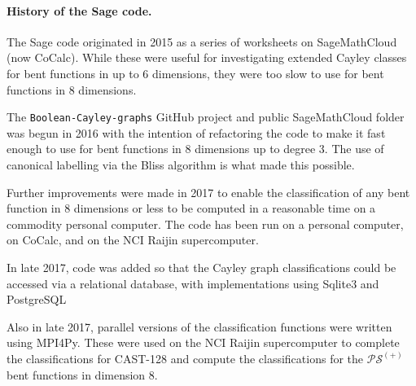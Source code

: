 \documentclass[12pt,a4paper]{article}
\begin{document}
\paragraph*{History of the Sage code.}

The Sage code originated in 2015 as a series of worksheets on Sage\-Math\-Cloud (now CoCalc).
While these were useful for investigating extended Cayley classes for bent functions in up to 6 dimensions,
they were too slow to use for bent functions in 8 dimensions.

The \texttt{Boolean-Cayley-graphs} GitHub project and public Sage\-Math\-Cloud folder was begun in 2016
with the intention of refactoring the code to make it fast enough to use for bent functions in 8 dimensions
up to degree 3.
The use of canonical labelling via the Bliss algorithm is what made this possible.

Further improvements were made in 2017 to enable the classification of any bent function in 8 dimensions or less
to be computed in a reasonable time on a commodity personal computer.
The code has been run on a personal computer, on CoCalc, and on the NCI Raijin supercomputer.

In late 2017, code was added so that the Cayley graph classifications could be accessed via a relational database,
with implementations using Sqlite3 and PostgreSQL \cite{Leo18Database}

Also in late 2017, parallel versions of the classification functions were written using MPI4Py.
These were used on the NCI Raijin supercomputer to complete the classifications for CAST-128 and compute
the classifications for the $\mathcal{PS}^{(+)}$ bent functions in dimension 8.
\end{document}
